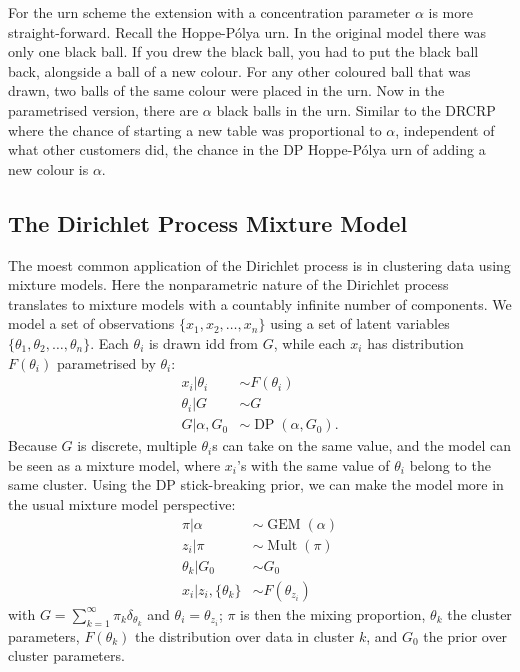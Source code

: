 For the urn scheme the extension with a concentration parameter $\alpha$ is more straight-forward. Recall the Hoppe-P\'olya urn. In the original model there was only one black ball. If you drew the black ball, you had to put the black ball back, alongside a ball of a new colour. For any other coloured ball that was drawn, two balls of the same colour were placed in the urn. Now in the parametrised version, there are $\alpha$ black balls in the urn. Similar to the DRCRP where the chance of starting a new table was proportional to $\alpha$, independent of what other customers did, the chance in the DP Hoppe-P\'olya urn of adding a new colour is $\alpha$.

\subsection{The Dirichlet Process Mixture Model}
The moest common application of the Dirichlet process is in clustering data using mixture models. Here the nonparametric nature of the Dirichlet process translates to mixture models with a countably infinite number of components. We model a set of observations $\{x_1, x_2, \ldots, x_n\}$ using a set of latent variables $\{\theta_1,\theta_2,\ldots,\theta_n\}$. Each $\theta_i$ is drawn idd from $G$, while each $x_i$ has distribution $F(\theta_i)$ parametrised by $\theta_i$:
\begin{align}
	x_i|\theta_i&\sim F(\theta_i) \\
    \theta_i|G&\sim G \\
    G|\alpha,G_0&\sim\operatorname{DP}(\alpha,G_0).
\end{align}
Because $G$ is discrete, multiple $\theta_i$s can take on the same value, and the model can be seen as a mixture model, where $x_i$'s with the same value of $\theta_i$ belong to the same cluster. Using the DP stick-breaking prior, we can make the model more in the usual mixture model perspective:
\begin{align}
	\pi|\alpha&\sim\operatorname{GEM}(\alpha) \\
    z_i|\pi&\sim\operatorname{Mult}(\pi) \\
    \theta_k|G_0&\sim G_0 \\
    x_i|z_i, \{\theta_k\}&\sim F(\theta_{z_i})
\end{align}
with $G = \sum_{k=1}^\infty \pi_k\delta_{\theta_k}$ and $\theta_i = \theta_{z_i}$; $\pi$ is then the mixing proportion, $\theta_k$ the cluster parameters, $F(\theta_k)$ the distribution over data in cluster $k$, and $G_0$ the prior over cluster parameters.

